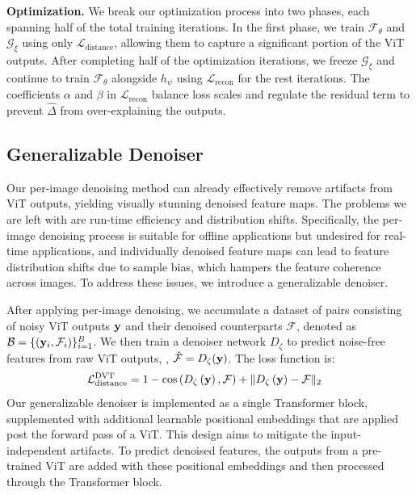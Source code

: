 \documentclass[runningheads]{llncs}
\newcommand{\ours}{DVT\xspace}
\renewcommand{\paragraph}[1]{\vspace{1.25mm}\noindent\textbf{#1}}
\begin{document}
\paragraph{Optimization.} We break our optimization process into two phases, each spanning half of the total training iterations. In the first phase, we train $\mathcal{F}_\theta$ and $\mathcal{G}_{\xi}$ using only $\mathcal{L}_{\text{distance}}$, allowing them to capture a significant portion of the ViT outputs. After completing half of the optimization iterations, we freeze $\mathcal{G}_\xi$ and continue to train $\mathcal{F}_\theta$ alongside $h_\psi$ using $\mathcal{L}_\text{recon}$ for the rest iterations. The coefficients $\alpha$ and $\beta$ in $\mathcal{L}_\text{recon}$ balance loss scales and regulate the residual term to prevent $\widehat{\Delta}$ from over-explaining the outputs.

\subsection{Generalizable Denoiser}
\label{sec:gen_denoiser}
Our per-image denoising method can already effectively remove artifacts from ViT outputs, yielding visually stunning denoised feature maps. The problems we are left with are run-time efficiency and distribution shifts. Specifically, the per-image denoising process is suitable for offline applications but undesired for real-time applications, and individually denoised feature maps can lead to feature distribution shifts due to sample bias, which hampers the feature coherence across images. To address these issues, we introduce a generalizable denoiser.

After applying per-image denoising, we accumulate a dataset of pairs consisting of noisy ViT outputs $\vb{y}$ and their denoised counterparts $\mathcal{F}$, denoted as $\mathcal{B}=\{\left(\vb{y}_i, \mathcal{F}_i\right)\}_{i=1}^B$. We then train a denoiser network  ${D}_\zeta$ to predict noise-free features from raw ViT outputs, \ie, $\hat{\mathcal{F}} = D_\zeta(\vb{y})$. The loss function is:
\begin{align}
    \mathcal{L}_{\text{distance}}^\text{\ours} & = 1 - \cos\left(D_\zeta\left(\vb{y}\right), \mathcal{F}\right) + \|D_\zeta\left(\vb{y}\right) - \mathcal{F} \|_2 \label{eq:gen_loss}
\end{align}
Our generalizable denoiser is implemented as a single Transformer block, supplemented with additional learnable positional embeddings that are applied post the forward pass of a ViT. This design aims to mitigate the input-independent artifacts. To predict denoised features, the outputs from a pre-trained ViT are added with these positional embeddings and then processed through the Transformer block.
\end{document}
